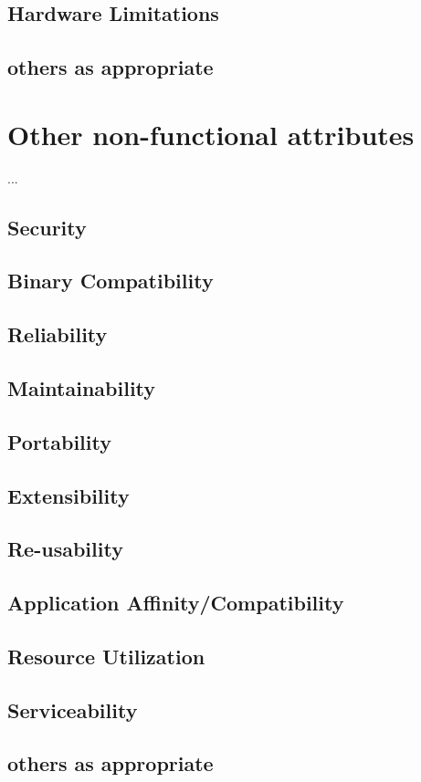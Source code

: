 \documentclass[]{article}
\begin{document}
\subsection{ Hardware Limitations}
\subsection{ others as appropriate}

\section{Other non-functional attributes}
... 
\subsection {Security}
\subsection {Binary Compatibility}
\subsection {Reliability}
\subsection {Maintainability}
\subsection {Portability}
\subsection {Extensibility}
\subsection {Re-usability}
\subsection {Application Affinity/Compatibility}
\subsection {Resource Utilization}
\subsection {Serviceability}
\subsection {others as appropriate}
\end{document}
